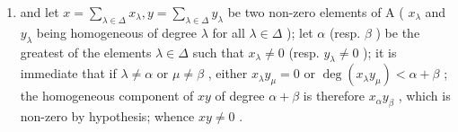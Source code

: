 \begin{enumerate}
\def\labelenumi{\arabic{enumi})}
\tightlist
\item
  and let \(x = \sum_{\lambda \in \Delta} x_{\lambda}, y = \sum_{\lambda \in \Delta} y_{\lambda}\) be two non-zero elements of A ( \(x_{\lambda}\) and \(y_{\lambda}\) being homogeneous of degree \(\lambda\) for all \(\lambda \in \Delta\) ); let \(\alpha\) (resp. \(\beta\) ) be the greatest of the elements \(\lambda \in \Delta\) such that \(x_{\lambda} \neq 0\) (resp. \(y_{\lambda} \neq 0\) ); it is immediate that if \(\lambda \neq \alpha\) or \(\mu \neq \beta\) , either \(x_{\lambda}y_{\mu} = 0\) or \(\deg(x_{\lambda}y_{\mu}) < \alpha + \beta\) ; the homogeneous component of \(xy\) of degree \(\alpha + \beta\) is therefore \(x_{\alpha}y_{\beta}\) , which is non-zero by hypothesis; whence \(xy \neq 0\) .
\end{enumerate}

